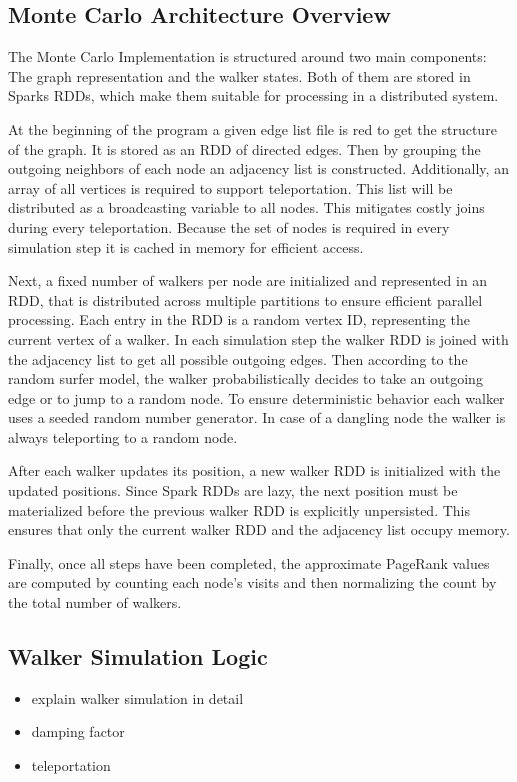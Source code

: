 \subsection{Monte Carlo Architecture Overview}
The Monte Carlo Implementation is structured around two main components: The graph representation and the walker states. Both of them are stored in Sparks RDDs, which make them suitable for processing in a distributed system. \par
At the beginning of the program a given edge list file is red to get the structure of the graph. It is stored as an RDD of directed edges. Then by grouping the outgoing neighbors of each node an adjacency list is constructed. Additionally, an array of all vertices is required to support teleportation. This list will be distributed as a broadcasting variable to all nodes. This mitigates costly joins during every teleportation. Because the set of nodes is required in every simulation step it is cached in memory for efficient access. \par
Next, a fixed number of walkers per node are initialized and represented in an RDD, that is distributed across multiple partitions to ensure efficient parallel processing. Each entry in the RDD is a random vertex ID, representing the current vertex of a walker. In each simulation step the walker RDD is joined with the adjacency list to get all possible outgoing edges. Then according to the random surfer model, the walker probabilistically decides to take an outgoing edge or to jump to a random node. To ensure deterministic behavior each walker uses a seeded random number generator. In case of a dangling node the walker is always teleporting to a random node. \par
After each walker updates its position, a new walker RDD is initialized with the updated positions. Since Spark RDDs are lazy, the next position must be materialized before the previous walker RDD is explicitly unpersisted. This ensures that only the current walker RDD and the adjacency list occupy memory. \par 
Finally, once all steps have been completed, the approximate PageRank values are computed by counting each node's visits and then normalizing the count by the total number of walkers. 



\subsection{Walker Simulation Logic}
\begin{itemize}
    \item explain walker simulation in detail
    \item damping factor
    \item teleportation
\end{itemize} 



